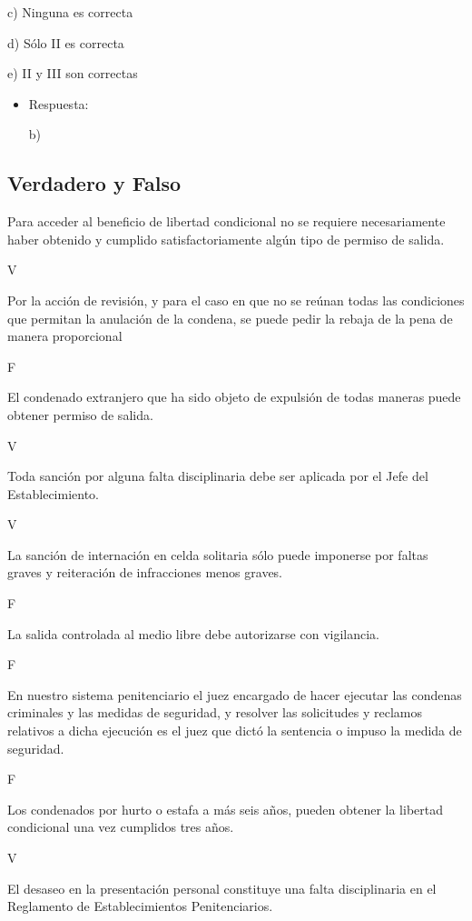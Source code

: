 \documentclass[letterpaper, 11pt]{article}
\begin{document}
c) Ninguna es correcta

d) Sólo II es correcta

e) II y III son correctas

\begin{itemize}
\item Respuesta:

b)
\end{itemize}


\subsection{Verdadero y Falso}
\label{sec:org54a8cc5}

Para acceder al beneficio de libertad condicional no se requiere
necesariamente haber obtenido y cumplido satisfactoriamente algún tipo de
permiso de salida.

V

Por la acción de revisión, y para el caso en que no se reúnan todas las
condiciones que permitan la anulación de la condena, se puede pedir la
rebaja de la pena de manera proporcional

F

El condenado extranjero que ha sido objeto de expulsión de todas maneras
puede obtener permiso de salida.

V

Toda sanción por alguna falta disciplinaria debe ser aplicada por el Jefe del
Establecimiento.

V

La sanción de internación en celda solitaria sólo puede imponerse por faltas
graves y reiteración de infracciones menos graves.

F

La salida controlada al medio libre debe autorizarse con vigilancia.

F

En nuestro sistema penitenciario el juez encargado de hacer ejecutar las
condenas criminales y las medidas de seguridad, y resolver las solicitudes y
reclamos relativos a dicha ejecución es el juez que dictó la sentencia o impuso
la medida de seguridad.

F

Los condenados por hurto o estafa a más seis años, pueden obtener la libertad
condicional una vez cumplidos tres años.

V

El desaseo en la presentación personal constituye una falta disciplinaria en el
Reglamento de Establecimientos Penitenciarios.
\end{document}
